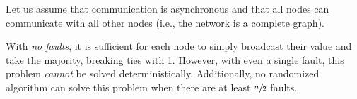 Let us assume that communication is asynchronous and that all nodes can
communicate with all other nodes (i.e., the network is a complete graph).

With \emph{no faults}, it is sufficient for each node to simply broadcast their
value and take the majority, breaking ties with 1. However, with even a single
fault, this problem \emph{cannot} be solved deterministically. Additionally, no
randomized algorithm can solve this problem when there are at least
$\sfrac{n}{2}$ faults.

